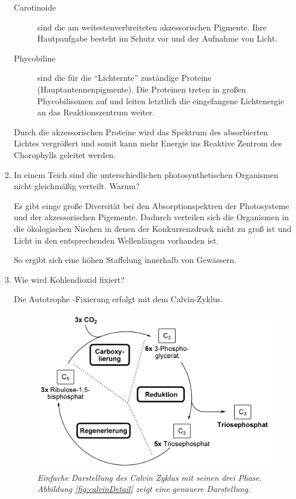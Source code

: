 \begin{enumerate}
		\begin{description}
			\item[Carotinoide]
				sind die am weitestenverbreiteten akzessorischen Pigmente.
				Ihre Hautpaufgabe besteht im Schutz vor und der Aufnahme von Licht.
			\item[Phycobiline] 
				sind die für die ``Lichternte'' zuständige Proteine (Hauptantennenpigmente).
				Die Proteinen treten in großen Phycobilisomen auf und leiten letztlich die
				eingefangene Lichtenergie an das Reaktionszentrum weiter.
		\end{description}

		Durch die akzessorischen Proteine wird das Spektrum des absorbierten Lichtes vergrößert
		und somit kann mehr Energie ins Reaktive Zentrom des Chorophylls geleitet werden.

	\item In einem Teich sind die unterschiedlichen photosynthetischen Organismen nicht gleichmäßig verteilt. Warum?

		Es gibt einge große Diversität bei den Absorptionspektren der Photosysteme
		und der akzessorischen Pigemente.
		Dadurch verteilen sich die Organismen in die ökologischen Nischen
		in denen der Konkurrenzdruck nicht zu groß ist
		und Licht in den entsprechenden Wellenlängen vorhanden ist.

		So ergibt sich eine höhen Staffelung innerhalb von Gewässern.

	\item Wie wird Kohlendioxid fixiert?

		Die Autotrophe -Fixierung erfolgt mit dem Calvin-Zyklus.
		
		\begin{figure}[ht!]
		\leavevmode
		\begin{center}
		\includegraphics[scale=0.33]{./pictures/calvin_simple_1000}
		\end{center}
		\caption{\slshape{Einfache Darstellung des Calvin Zyklus mit seinen drei Phase. 
		Abbildung \ref{fig:calvinDetail} zeigt eine genauere Darstellung.}}
		\label{fig:calvinSimple}
		\end{figure}
\end{enumerate}
